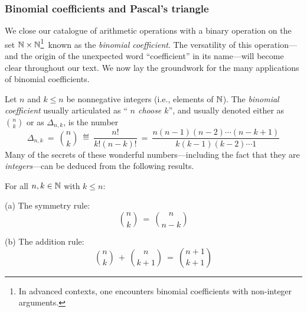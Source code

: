 \subsubsection{Binomial coefficients and Pascal's triangle}
\label{sec:binomial-coeff}

We close our catalogue of arithmetic operations with a binary
operation on the set $\mathbb{N} \times \mathbb{N}$\footnote{In advanced contexts, one
  encounters binomial coefficients with non-integer arguments.}~known
as the {\it binomial coefficient}.  The versatility of this
operation---and the origin of the unexpected word ``coefficient'' in
its name---will become clear throughout our text.  We now lay the
groundwork for the many applications of binomial coefficients.


\medskip

Let $n$ and $k \leq n$ be nonnegative integers (i.e., elements of
$\mathbb{N}$).  The {\it binomial coefficient} usually articulated as ``{\it
  $n$ choose $k$}'',
and usually denoted either as $\displaystyle {n \choose k}$ or as
$\Delta_{n,k}$, is the number 
\begin{equation}
\label{eq:binom-coeff}
\Delta_{n,k} \ = \
{n \choose k} \ \eqdef \ \frac{n!}{k!(n-k)!} \ = \
\frac{n(n-1)(n-2) \cdots (n-k+1)}{k (k-1)(k-2) \cdots 1}
\end{equation}
Many of the secrets of these wonderful numbers---including the fact
that they are {\em integers}---can be deduced from the following
results.

\begin{prop}
\label{thm:manipulate-binom-coeff}
For all $n, k \in \mathbb{N}$ with $k \leq n$:

{\rm (a)} The symmetry rule:
\begin{equation}
\label{eq:symmetry-binom-coeff}
{n \choose k} \ = \ {n \choose {n-k}}
\end{equation}

{\rm (b)} The addition rule:
\begin{equation}
\label{eq:add-binom-coeff}
{n \choose k} \ + \ {n \choose {k+1}} \ = \ {{n+1} \choose {k+1}}
\end{equation}
\end{prop}

